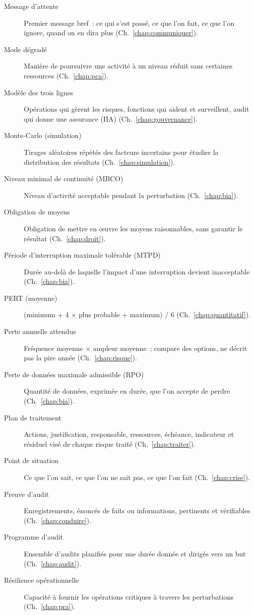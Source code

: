 \begin{description}
    \item[Message d'attente] Premier message bref~: ce qui s'est passé, ce que l'on fait, ce que l'on ignore, quand on en dira plus (Ch.~\ref{chap:communiquer}).
    \item[Mode dégradé] Manière de poursuivre une activité à un niveau réduit sans certaines ressources (Ch.~\ref{chap:pca}).
    \item[Modèle des trois lignes] Opérations qui gèrent les risques, fonctions qui aident et surveillent, audit qui donne une assurance (IIA) (Ch.~\ref{chap:gouvernance}).
    \item[Monte-Carlo (simulation)] Tirages aléatoires répétés des facteurs incertains pour étudier la distribution des résultats (Ch.~\ref{chap:simulation}).
    \item[Niveau minimal de continuité (MBCO)] Niveau d'activité acceptable pendant la perturbation (Ch.~\ref{chap:bia}).
    \item[Obligation de moyens] Obligation de mettre en œuvre les moyens raisonnables, sans garantir le résultat (Ch.~\ref{chap:droit}).
    \item[Période d'interruption maximale tolérable (MTPD)] Durée au-delà de laquelle l'impact d'une interruption devient inacceptable (Ch.~\ref{chap:bia}).
    \item[PERT (moyenne)] (minimum + 4 × plus probable + maximum) / 6 (Ch.~\ref{chap:quantitatif}).
    \item[Perte annuelle attendue] Fréquence moyenne × ampleur moyenne~; compare des options, ne décrit pas la pire année (Ch.~\ref{chap:risque}).
    \item[Perte de données maximale admissible (RPO)] Quantité de données, exprimée en durée, que l'on accepte de perdre (Ch.~\ref{chap:bia}).
    \item[Plan de traitement] Actions, justification, responsable, ressources, échéance, indicateur et résiduel visé de chaque risque traité (Ch.~\ref{chap:traiter}).
    \item[Point de situation] Ce que l'on sait, ce que l'on ne sait pas, ce que l'on fait (Ch.~\ref{chap:crise}).
    \item[Preuve d'audit] Enregistrements, énoncés de faits ou informations, pertinents et vérifiables (Ch.~\ref{chap:conduire}).
    \item[Programme d'audit] Ensemble d'audits planifiés pour une durée donnée et dirigés vers un but (Ch.~\ref{chap:audit}).
    \item[Résilience opérationnelle] Capacité à fournir les opérations critiques à travers les perturbations (Ch.~\ref{chap:pra}).

\end{description}
